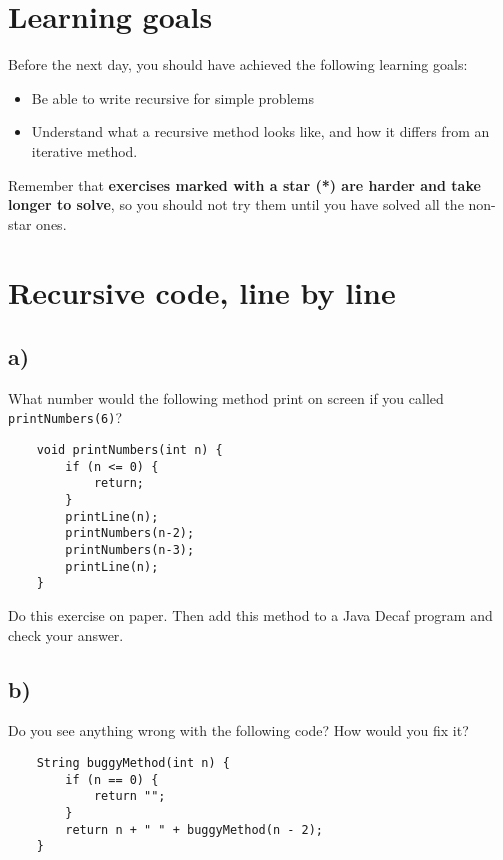 \documentclass{article}
\begin{document}
\section*{Learning goals}
\label{sec:learning-goals}

Before the next day, you should have achieved the following learning
goals: 

\begin{itemize}
\item Be able to write recursive for simple problems
\item Understand what a recursive method looks like, and how it
  differs from an iterative method. 
\end{itemize}

Remember that \textbf{exercises marked with a star (*) are harder and take
longer to solve}, so you should not try them until you have solved all
the non-star ones. 

\section{Recursive code, line by line}
\label{sec:read-recurs-code}

\subsection*{a)}

What number would the following method print on screen if you called
\verb+printNumbers(6)+?

\begin{verbatim}
    void printNumbers(int n) {
        if (n <= 0) {
            return;
        }
        printLine(n);
        printNumbers(n-2);
        printNumbers(n-3);
        printLine(n);
    }
\end{verbatim}

Do this exercise on paper. Then add this method to a Java Decaf
program and check your answer. 

\subsection*{b)}
\label{sec:b-1}

Do you see anything wrong with the following code? How would you fix it?

\begin{verbatim}
    String buggyMethod(int n) {
        if (n == 0) {
            return "";
        }
        return n + " " + buggyMethod(n - 2);
    }
\end{verbatim}
\end{document}
